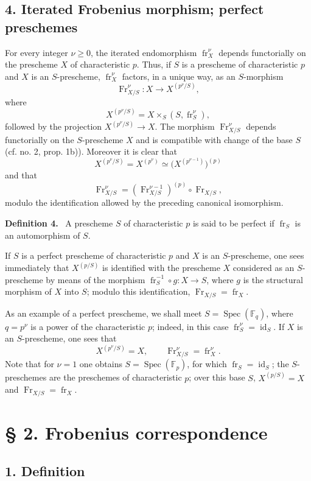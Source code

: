 \documentclass[11pt]{article}
\newenvironment{statement}[1]{\par\medskip\noindent\textbf{#1.}\ }{\par\medskip}
\DeclareMathOperator{\Spec}{Spec}
\providecommand{\id}{\operatorname{id}}
\providecommand{\id}{\operatorname{id}}
\providecommand{\id}{\operatorname{id}}
\providecommand{\id}{\operatorname{id}}
\providecommand{\Spec}{\operatorname{Spec}}
\providecommand{\Spec}{\operatorname{Spec}}
\providecommand{\id}{\operatorname{id}}
\providecommand{\Spec}{\operatorname{Spec}}
\providecommand{\fr}{\operatorname{fr}}
\providecommand{\Fr}{\operatorname{Fr}}
\providecommand{\Fr}{\operatorname{Fr}}
\providecommand{\fr}{\operatorname{fr}}
\providecommand{\Spec}{\operatorname{Spec}}
\providecommand{\id}{\operatorname{id}}
\begin{document}
\subsection*{4. Iterated Frobenius morphism; perfect preschemes}

For every integer $\nu\geq0$, the iterated endomorphism $\fr_X^\nu$ depends functorially on the prescheme $X$ of characteristic $p$. Thus, if $S$ is a prescheme of characteristic $p$ and $X$ is an $S$-prescheme, $\fr_X^\nu$ factors, in a unique way, as an $S$-morphism
\[
\Fr_{X/S}^\nu:X\longrightarrow X^{(p^\nu/S)},
\]
where
\[
X^{(p^\nu/S)}=X\times_S(S,\fr_S^\nu),
\]
followed by the projection $X^{(p^\nu/S)}\to X$. The morphism $\Fr_{X/S}^\nu$ depends functorially on the $S$-prescheme $X$ and is compatible with change of the base $S$ (cf. no. 2, prop. 1b)). Moreover it is clear that
\[
X^{(p^\nu/S)}=X^{(p^\nu)}\simeq\bigl(X^{(p^{\nu-1})}\bigr)^{(p)}
\]
and that
\[
\Fr_{X/S}^\nu=(\Fr_{X/S}^{\nu-1})^{(p)}\circ\Fr_{X/S},
\]
modulo the identification allowed by the preceding canonical isomorphism.

\begin{statement}{Definition 4}
A prescheme $S$ of characteristic $p$ is said to be perfect if $\fr_S$ is an automorphism of $S$.
\end{statement}

If $S$ is a perfect prescheme of characteristic $p$ and $X$ is an $S$-prescheme, one sees immediately that $X^{(p/S)}$ is identified with the prescheme $X$ considered as an $S$-prescheme by means of the morphism $\fr_S^{-1}\circ g:X\to S$, where $g$ is the structural morphism of $X$ into $S$; modulo this identification, $\Fr_{X/S}=\fr_X$.

As an example of a perfect prescheme, we shall meet $S=\Spec(\mathbb F_q)$, where $q=p^\nu$ is a power of the characteristic $p$; indeed, in this case $\fr_S^\nu=\id_S$. If $X$ is an $S$-prescheme, one sees that
\[
X^{(p^\nu/S)}=X,
\qquad
\Fr_{X/S}^\nu=\fr_X^\nu.
\]
Note that for $\nu=1$ one obtains $S=\Spec(\mathbb F_p)$, for which $\fr_S=\id_S$; the $S$-preschemes are the preschemes of characteristic $p$; over this base $S$, $X^{(p/S)}=X$ and $\Fr_{X/S}=\fr_X$.

\section*{§ 2. Frobenius correspondence}

\subsection*{1. Definition}
\end{document}
